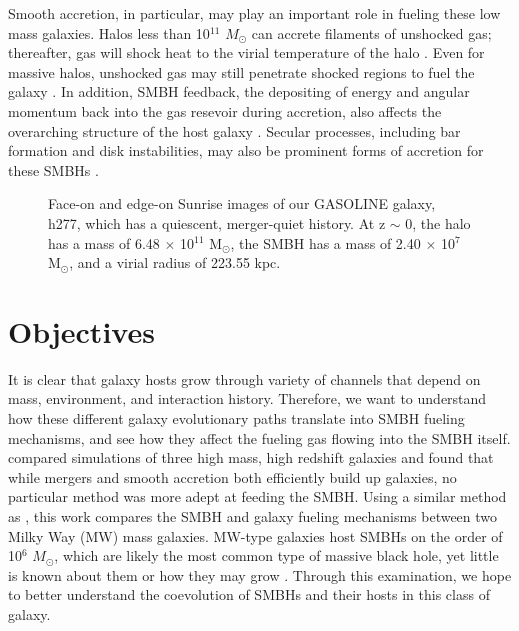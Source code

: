 \documentclass[12pt,headA,chapB]{fiskthesis}
\begin{document}
Smooth accretion, in particular, may play an important role in fueling these low mass galaxies. Halos less than 10$^{11}$ $M_{\odot}$ can accrete filaments of unshocked gas; thereafter, gas will shock heat to the virial temperature of the halo \citep{Keres2005}. Even for massive halos, unshocked gas may still penetrate shocked regions to fuel the galaxy \citep{Brooks2007,Dekel2009,Nelson2013}. In addition, SMBH feedback, the depositing of energy and angular momentum back into the gas resevoir during accretion, also affects the overarching structure of the host galaxy \citep{Governato2009a}. Secular processes, including bar formation and disk instabilities, may also be prominent forms of accretion for these SMBHs \citep{Kormendy2013}. 

\begin{figure}[h]
\centerline{}
\caption[GASOLINE h277]{Face-on and edge-on Sunrise images of our GASOLINE galaxy, h277, which has a quiescent, merger-quiet history. At z $\sim$ 0, the halo has a mass of 6.48 $\times$ 10$^{11}$ M$_{\odot}$, the SMBH has a mass of 2.40 $\times$ 10$^7$ M$_{\odot}$, and a virial radius of 223.55 kpc. }
\label{h277face} 
\end{figure}

\section{Objectives}
It is clear that galaxy hosts grow through variety of channels that depend on mass, environment, and interaction history. Therefore, we want to understand how these different galaxy evolutionary paths translate into SMBH fueling mechanisms, and see how they affect the fueling gas flowing into the SMBH itself. \cite{Bellovary2013} compared simulations of three high mass, high redshift galaxies and found that while mergers and smooth accretion both efficiently build up galaxies, no particular method was more adept at feeding the SMBH. Using a similar method as \cite{Bellovary2013}, this work compares the SMBH and galaxy fueling mechanisms between two Milky Way (MW) mass galaxies. MW-type galaxies host SMBHs on the order of 10$^6$ $M_{\odot}$, which are likely the most common type of massive black hole, yet little is known about them or how they may grow \citep{Kormendy2013}. Through this examination, we hope to better understand the coevolution of SMBHs and their hosts in this class of galaxy. 
\end{document}
